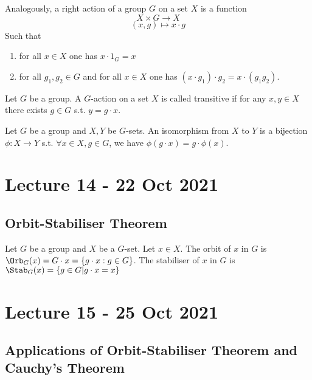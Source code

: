 \documentclass[11pt]{scrartcl}
\begin{document}
\begin{definition}
  Analogously, a right action of a group $G$ on a set $X$ is a function
  \[X\times G \to X\]
  \[(x,g)\mapsto x\cdot g\]
  Such that
  \begin{enumerate}
    \item for all $x\in X$ one has $x\cdot 1_G=x$
    \item for all $g_1,g_2\in G$ and for all $x\in X$ one has $(x\cdot g_1)\cdot g_2 =
      x\cdot (g_1g_2)$.
  \end{enumerate}
  \label{def:rightAction}
\end{definition}

\begin{definition}
  Let $G$ be a group. A $G$-action on a set $X$ is called transitive if for any $x,y\in X$
  there exists $g\in G$ s.t. $y=g\cdot x$.
  \label{def:transitiveAction}
\end{definition}

\begin{definition} 
  Let $G$ be a group and $X,Y$ be $G$-sets. An isomorphism from $X$ to $Y$ is a bijection
  $\phi:X\to Y$ s.t. $\forall x\in X, g\in G$, we have $\phi(g\cdot x)=g\cdot \phi(x)$.
  \label{defi:isomorphismAction}
\end{definition}

\section{Lecture 14 - 22 Oct 2021}

\subsection{Orbit-Stabiliser Theorem}

\begin{definition}
  Let $G$ be a group and $X$ be a $G$-set. Let $x\in X$. The orbit of $x$ in $G$ is
  $\Orb_G (x)= G\cdot x = \left\{ g\cdot x :g\in G\right\}$.
  The stabiliser of $x$ in $G$ is $\Stab_G (x)=\left\{ g\in G | g\cdot x=x \right\}$
  \label{def:orbStab}
\end{definition}

\section{Lecture 15 - 25 Oct 2021}

\subsection{Applications of Orbit-Stabiliser Theorem and Cauchy's Theorem}
\end{document}
